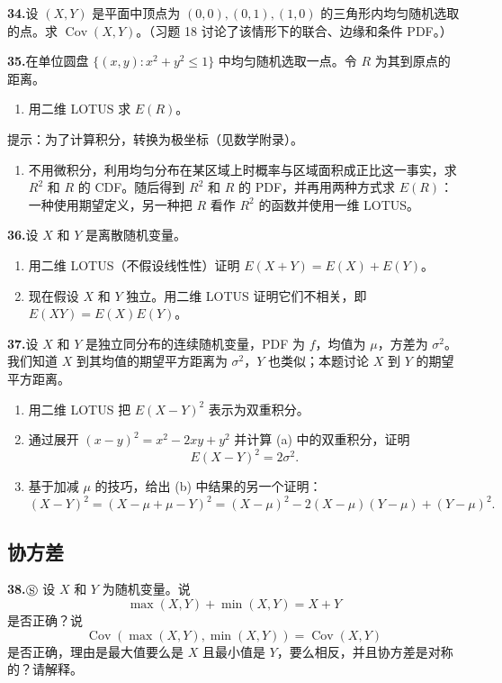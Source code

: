 \documentclass[UTF8,12pt,a4paper,fontset=fandol]{ctexart}
\begin{document}
\noindent\textbf{34.}\quad 设 $(X,Y)$ 是平面中顶点为 $(0,0),(0,1),(1,0)$ 的三角形内均匀随机选取的点。求 $\operatorname{Cov}(X,Y)$。（习题 18 讨论了该情形下的联合、边缘和条件 PDF。）

\noindent\textbf{35.}\quad 在单位圆盘 $\{(x,y):x^2+y^2\le 1\}$ 中均匀随机选取一点。令 $R$ 为其到原点的距离。
\begin{enumerate}
  \item[(a)] 用二维 LOTUS 求 $E(R)$。
\end{enumerate}
提示：为了计算积分，转换为极坐标（见数学附录）。
\begin{enumerate}
  \item[(b)] 不用微积分，利用均匀分布在某区域上时概率与区域面积成正比这一事实，求 $R^2$ 和 $R$ 的 CDF。随后得到 $R^2$ 和 $R$ 的 PDF，并再用两种方式求 $E(R)$：一种使用期望定义，另一种把 $R$ 看作 $R^2$ 的函数并使用一维 LOTUS。
\end{enumerate}

\noindent\textbf{36.}\quad 设 $X$ 和 $Y$ 是离散随机变量。
\begin{enumerate}
  \item[(a)] 用二维 LOTUS（不假设线性性）证明 $E(X+Y)=E(X)+E(Y)$。
  \item[(b)] 现在假设 $X$ 和 $Y$ 独立。用二维 LOTUS 证明它们不相关，即 $E(XY)=E(X)E(Y)$。
\end{enumerate}

\noindent\textbf{37.}\quad 设 $X$ 和 $Y$ 是独立同分布的连续随机变量，PDF 为 $f$，均值为 $\mu$，方差为 $\sigma^2$。我们知道 $X$ 到其均值的期望平方距离为 $\sigma^2$，$Y$ 也类似；本题讨论 $X$ 到 $Y$ 的期望平方距离。
\begin{enumerate}
  \item[(a)] 用二维 LOTUS 把 $E(X-Y)^2$ 表示为双重积分。
  \item[(b)] 通过展开 $(x-y)^2=x^2-2xy+y^2$ 并计算 (a) 中的双重积分，证明
  \[
    E(X-Y)^2=2\sigma^2.
  \]
  \item[(c)] 基于加减 $\mu$ 的技巧，给出 (b) 中结果的另一个证明：
  \[
    (X-Y)^2=(X-\mu+\mu-Y)^2=(X-\mu)^2-2(X-\mu)(Y-\mu)+(Y-\mu)^2.
  \]
\end{enumerate}

\subsection*{协方差}

\noindent\textbf{38.}\quad $\circledS$ 设 $X$ 和 $Y$ 为随机变量。说
\[
  \max(X,Y)+\min(X,Y)=X+Y
\]
是否正确？说
\[
  \operatorname{Cov}(\max(X,Y),\min(X,Y))=\operatorname{Cov}(X,Y)
\]
是否正确，理由是最大值要么是 $X$ 且最小值是 $Y$，要么相反，并且协方差是对称的？请解释。
\end{document}
